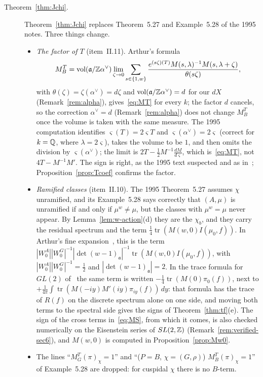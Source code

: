 \begin{description}
\item[Theorem~\ref{thm:Jchi}.] Theorem~\ref{thm:Jchi} replaces Theorem~5.27 and Example~5.28 of the
1995 notes. Three things change.
\begin{itemize}
\item \emph{The factor of $T$} (item~II.11). Arthur's formula
  \[
  M_B^T=\mathrm{vol}(\mathfrak a/\mathbb{Z}\alpha^\vee)\lim_{\zeta\to0}
  \sum_{s\in\{1,w\}}\frac{e^{(s\zeta)(T)}M(s,\lambda)^{-1}
  M(s,\lambda+\zeta)}{\theta(s\zeta)},
  \]
  with $\theta(\zeta)=\zeta(\alpha^\vee)=d\zeta$
  and $\mathrm{vol}(\mathfrak a/\mathbb{Z}\alpha^\vee)=d$ for our $dX$
  (Remark~\ref{rem:alpha}), gives~\eqref{eq:MT} for every $k$; the factor
  $d$ cancels, so the correction $\alpha^\vee=d$ (Remark~\ref{rem:alpha}) does not change
  $M_B^T$ once the volume is taken with the same measure. The 1995
  computation identifies $\varsigma(T)=2\varsigma T$ and
  $\varsigma(\alpha^\vee)=2\varsigma$ (correct for $k=\mathbb{Q}$, where
  $\lambda=2\varsigma$), takes the volume to be $1$, and then omits the
  division by $\varsigma(\alpha^\vee)$; the limit is
  $2T-\frac12M^{-1}\frac{dM}{d\varsigma}$, which is~\eqref{eq:MT}, not
  $4T-M^{-1}M'$. The sign is right, as the 1995 text suspected and as
  in~\cite{LL}; Proposition~\ref{prop:Tcoef} confirms the factor.
\item \emph{Ramified classes} (item~II.10). The 1995 Theorem~5.27 assumes
  $\chi$ unramified, and its Example~5.28 says correctly that $(A,\mu)$
  is unramified if and only if $\mu^w\ne\mu$, but the classes with
  $\mu^w=\mu$ never appear. By Lemma~\ref{lem:w-action}(d) they are the
  $\chi_b$, and they carry the residual spectrum and the term
  $\frac14\operatorname{tr}(M(w,0)I(\mu_0,f))$. In Arthur's fine
  expansion~\cite[Thm.~8.2]{A14}, \cite{LiIII} this is the term
  $|W^A_0||W^G_0|^{-1}|\det(w-1)_{\mathfrak a}|^{-1}
  \operatorname{tr}(M(w,0)I(\mu_0,f))$, with $|W^A_0||W^G_0|^{-1}=\frac12$
  and $|\det(w-1)_{\mathfrak a}|=2$. In the trace formula for $GL(2)$
  of~\cite[\S6]{GJ} the same term is written $-\frac14\operatorname{tr}
  (M(0)\pi_0(f))$, next to $+\frac1{4\pi}\int\operatorname{tr}(M(-iy)M'(iy)
  \pi_{iy}(f))\,dy$: that formula has the trace of $R(f)$ on the discrete
  spectrum alone on one side, and moving both terms to the spectral side
  gives the signs of Theorem~\ref{thm:tf}(e). The sign of the cross terms
  in~\eqref{eq:MS}, from which it comes, is also checked numerically on
  the Eisenstein series of $SL(2,\mathbb{Z})$ (Remark~\ref{rem:verified-sec6}),
  and $M(w,0)$ is computed in Proposition~\ref{prop:Mw0}.
\item The lines ``$M_G^T(\pi)_\chi=1$'' and ``($P=B$, $\chi=(G,\rho)$)
  $M_B^T(\pi)_\chi=1$'' of Example~5.28 are dropped: for cuspidal $\chi$
  there is no $B$-term.
\end{itemize}


\end{description}

